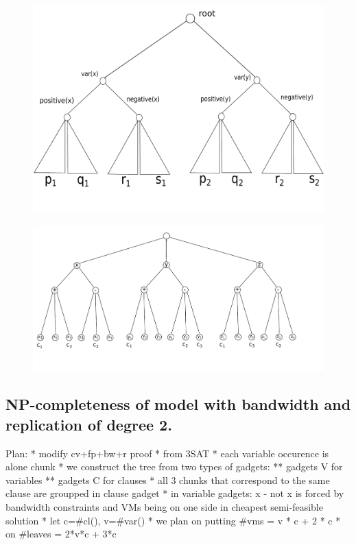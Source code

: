 \begin{figure}[htbp]
\includegraphics[width = \columnwidth]{figs/lemma-two-gadgets.pdf}
\end{figure}


\begin{figure}[htbp]
\includegraphics[width = \columnwidth]{figs/formula-example.pdf}
\end{figure}




\subsection{NP-completeness of model with bandwidth and replication of
  degree 2.
}
\iffalse
Plan:
* modify cv+fp+bw+r proof
* from 3SAT
* each variable occurence is alone chunk
* we construct the tree from two types of gadgets:
** gadgets V for variables
** gadgets C for clauses
* all 3 chunks that correspond to the same clause are groupped in
clause gadget  
* in variable gadgets: x - not x is forced by bandwidth constraints
and VMs being on one side in cheapest semi-feasible solution
* let c=#cl(\Psi), v=#var(\Psi)
* we plan on putting #vms = v * c + 2 * c
* on #leaves = 2*v*c + 3*c

